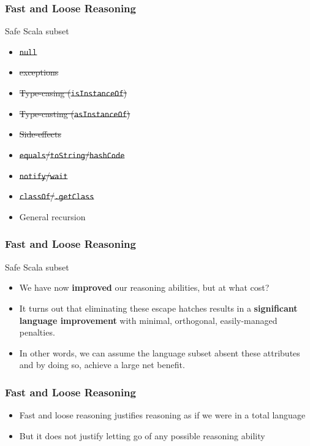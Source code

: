 \begin{frame}[fragile]
\frametitle{Fast and Loose Reasoning}
\begin{block}{Safe Scala subset}
\begin{itemize}
  \item \sout{\lstinline{null}}
  \item \sout{exceptions}
  \item \sout{Type-casing (\lstinline{isInstanceOf})}
  \item \sout{Type-casting (\lstinline{asInstanceOf})}
  \item \sout{Side-effects}
  \item \sout{\lstinline{equals}/\lstinline{toString}/\lstinline{hashCode}}
  \item \sout{\lstinline{notify}/\lstinline{wait}}
  \item \sout{\lstinline{classOf}/\lstinline{.getClass}}
  \item General recursion
\end{itemize}
\end{block}
\end{frame}

\begin{frame}[fragile]
\frametitle{Fast and Loose Reasoning}
\begin{block}{Safe Scala subset}
\begin{itemize}
  \item<1> We have now \textbf{improved} our reasoning abilities, but at what cost?
  \item<2> It turns out that eliminating these escape hatches results in a \textbf{significant language improvement} with minimal, orthogonal, easily-managed penalties.
  \item<3> In other words, we can assume the language subset absent these attributes and by doing so, achieve a large net benefit.
\end{itemize}
\end{block}
\end{frame}

\begin{frame}[fragile]
\frametitle{Fast and Loose Reasoning}
\begin{itemize}
  \item<1> Fast and loose reasoning justifies reasoning as if we were in a total language
  \item<2> But it does not justify letting go of any possible reasoning ability
\end{itemize}
\end{frame}

